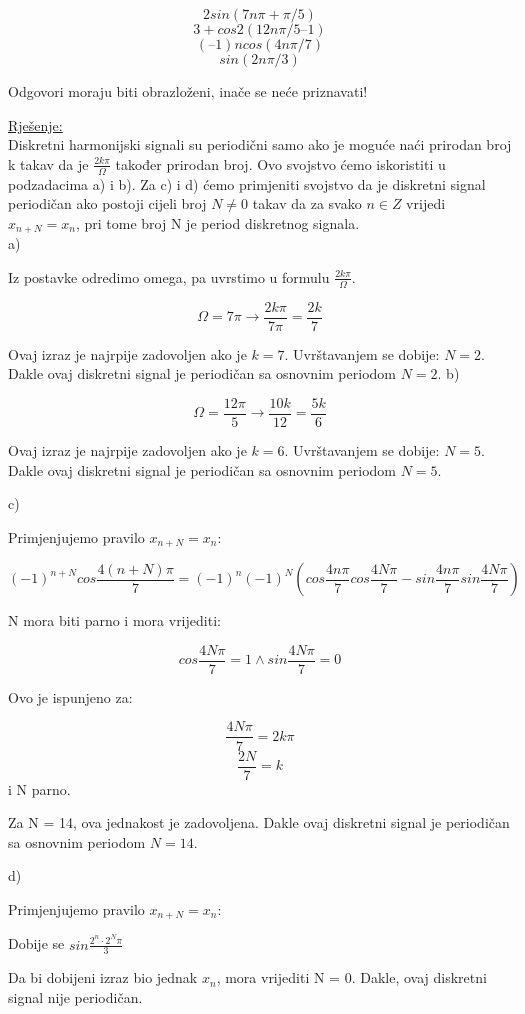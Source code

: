 \documentclass[12pt]{article}
\begin{document}
$$2 sin (7n \pi + \pi/5)$$
$$3 + cos2 (12n\pi/5 – 1)$$
$$(–1)n cos (4n\pi/7)$$
$$sin (2n \pi/3)$$

Odgovori moraju biti obrazloženi, inače se neće priznavati!


\underline{Rješenje:}
\\
Diskretni harmonijski signali su periodični samo ako je moguće naći prirodan broj k takav da je $\frac{2 k \pi}{\Omega}$ također prirodan broj. Ovo svojstvo ćemo iskoristiti u podzadacima a) i b). Za c) i d) ćemo primjeniti svojstvo da je diskretni signal periodičan ako postoji cijeli broj $N \neq 0$  takav da za svako $n \in Z$ vrijedi $x_{n + N} = x_n$, pri tome broj N je period diskretnog signala.
\\
a)

Iz postavke odredimo omega, pa uvrstimo u formulu $\frac{2 k \pi}{\Omega}$.

$$\Omega = 7 \pi \to \frac{2 k \pi}{7 \pi} = \frac{2k}{7}$$

Ovaj izraz je najrpije zadovoljen ako je $k = 7$. Uvrštavanjem se dobije: $N = 2$. Dakle ovaj diskretni signal je periodičan sa osnovnim periodom $N = 2$.
\newpage
b)

$$\Omega = \frac{12 \pi}{5} \to \frac{10 k}{12} = \frac{5k}{6}$$

Ovaj izraz je najrpije zadovoljen ako je $k = 6$. Uvrštavanjem se dobije: $N = 5$. Dakle ovaj diskretni signal je periodičan sa osnovnim periodom $N = 5$.

c)

Primjenjujemo pravilo $x_{n + N} = x_n$:

$$(-1) ^{n + N} cos \frac{4(n + N) \pi}{7} = (-1)^n (-1) ^N (cos \frac{4 n \pi}{7} cos \frac{4 N \pi}{7} - sin \frac{4 n \pi}{7} sin \frac{
 4 N \pi}{7})$$

N mora biti parno i mora vrijediti:

$$cos \frac{4 N \pi}{7} = 1 \land sin \frac{4 N \pi}{7} = 0$$

Ovo je ispunjeno za: 

$$\frac{4 N \pi}{7} = 2 k \pi$$
$$\frac{2N}{7} = k$$
i N parno.

Za N = 14, ova jednakost je zadovoljena.  Dakle ovaj diskretni signal je periodičan sa osnovnim periodom $N = 14$.

d)

Primjenjujemo pravilo $x_{n + N} = x_n$:

Dobije se $sin \frac{2^n \cdot 2^N \pi}{3}$

Da bi dobijeni izraz bio jednak $x_n$, mora vrijediti N = 0. Dakle, ovaj diskretni signal nije periodičan.
\end{document}
